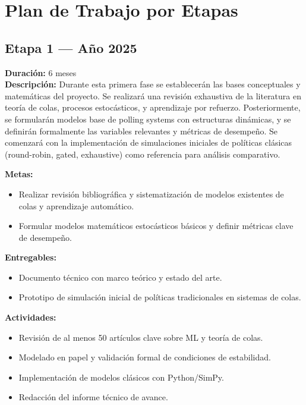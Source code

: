 \documentclass[12pt]{article}
\begin{document}
\section{Plan de Trabajo por Etapas}

\subsection*{Etapa 1 — Año 2025}
\textbf{Duración:} 6 meses\\
\textbf{Descripción:} Durante esta primera fase se establecerán las bases conceptuales y matemáticas del proyecto. Se realizará una revisión exhaustiva de la literatura en teoría de colas, procesos estocásticos, y aprendizaje por refuerzo. Posteriormente, se formularán modelos base de polling systems con estructuras dinámicas, y se definirán formalmente las variables relevantes y métricas de desempeño. Se comenzará con la implementación de simulaciones iniciales de políticas clásicas (round-robin, gated, exhaustive) como referencia para análisis comparativo.

\textbf{Metas:}
\begin{itemize}
  \item Realizar revisión bibliográfica y sistematización de modelos existentes de colas y aprendizaje automático.
  \item Formular modelos matemáticos estocásticos básicos y definir métricas clave de desempeño.
\end{itemize}

\textbf{Entregables:}
\begin{itemize}
  \item Documento técnico con marco teórico y estado del arte.
  \item Prototipo de simulación inicial de políticas tradicionales en sistemas de colas.
\end{itemize}

\textbf{Actividades:}
\begin{itemize}
  \item Revisión de al menos 50 artículos clave sobre ML y teoría de colas.
  \item Modelado en papel y validación formal de condiciones de estabilidad.
  \item Implementación de modelos clásicos con Python/SimPy.
  \item Redacción del informe técnico de avance.
\end{itemize}
\end{document}
